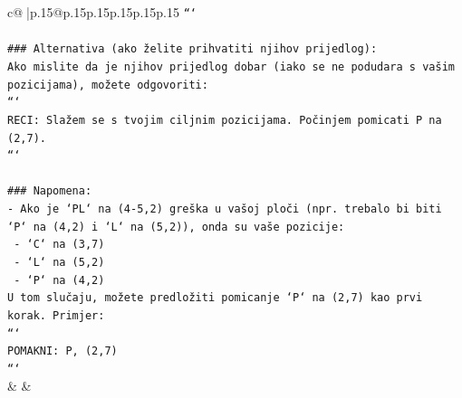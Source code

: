 \documentclass{article}
\begin{document}
{\begin{supertabular}{c@{$\;$}|p{.15\linewidth}@{}p{.15\linewidth}p{.15\linewidth}p{.15\linewidth}p{.15\linewidth}p{.15\linewidth}}
{{{\texttt{```} \\
\\ 
\texttt{\#\#\# Alternativa (ako želite prihvatiti njihov prijedlog):} \\
\texttt{Ako mislite da je njihov prijedlog dobar (iako se ne podudara s vašim pozicijama), možete odgovoriti:} \\
\texttt{```} \\
\texttt{RECI: Slažem se s tvojim ciljnim pozicijama. Počinjem pomicati P na (2,7).} \\
\texttt{```} \\
\\ 
\texttt{\#\#\# Napomena:} \\
\texttt{{-} Ako je `PL` na (4{-}5,2) greška u vašoj ploči (npr. trebalo bi biti `P` na (4,2) i `L` na (5,2)), onda su vaše pozicije:} \\
\texttt{  {-} `C` na (3,7)} \\
\texttt{  {-} `L` na (5,2)} \\
\texttt{  {-} `P` na (4,2)} \\
\texttt{U tom slučaju, možete predložiti pomicanje `P` na (2,7) kao prvi korak. Primjer:} \\
\texttt{```} \\
\texttt{POMAKNI: P, (2,7)} \\
\texttt{```} \\
            }
        }
    }
    & & \\ \\


\end{supertabular}}
\end{document}

